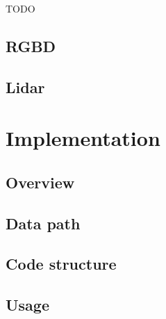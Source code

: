 TODO

\subsection{RGBD}\label{rgbd}

\subsection{Lidar}\label{lidar}

\section{Implementation}\label{implementation-1}

\subsection{Overview}\label{overview}

\subsection{Data path}\label{data-path}

\subsection{Code structure}\label{code-structure}

\subsection{Usage}\label{usage}

